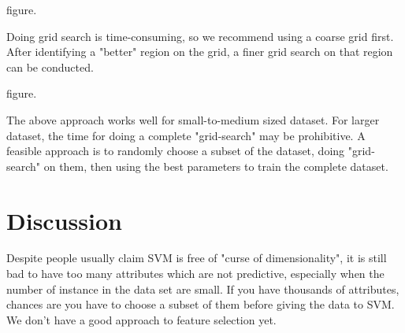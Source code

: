 \documentclass[12pt]{article}
\begin{document}
figure.

Doing grid search is time-consuming, 
so we recommend using a coarse grid first. 
After identifying a "better" region on the
grid, a finer grid search on that region can 
be conducted.

figure.

The above approach works well for small-to-medium 
sized dataset. For larger dataset, the time for
doing a complete "grid-search" may be prohibitive.
A feasible approach is to randomly choose
a subset of the dataset, doing "grid-search" on
them, then using the best parameters to train
the complete dataset.

\section{Discussion}

Despite people usually claim SVM is free of 
"curse of dimensionality", it is still bad to 
have too many attributes which are not predictive, 
especially when the number of instance in the
data set are small. If you have thousands of
attributes, chances are you have to choose a 
subset of them before giving the data to SVM.
We don't have a good approach to feature 
selection yet.
\end{document}
